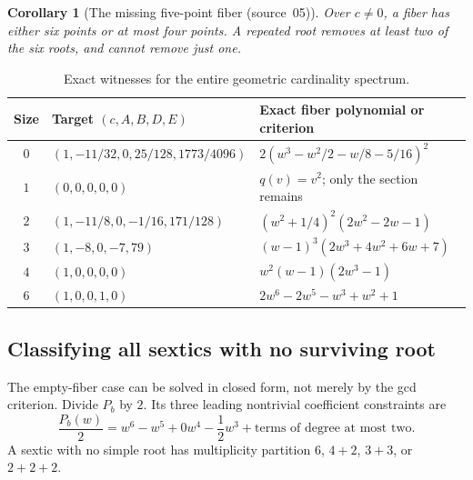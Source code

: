 \documentclass[11pt,a4paper]{article}
\newtheorem{corollary}[theorem]{Corollary}
\theoremstyle{definition}
\newcommand{\src}[1]{\textup{(source~#1)}}
\begin{document}
\begin{corollary}[The missing five-point fiber \src{05}]\label{f6:kf:cor:no5}
Over $c\ne0$, a fiber has either six points or at most four points. A
repeated root removes at least two of the six roots, and cannot remove just
one.
\end{corollary}

\begin{table}[htbp]
\centering\small
\renewcommand{\arraystretch}{1.4}
\begin{tabularx}{\textwidth}{@{}c>{\raggedright\arraybackslash}p{}X@{}}
\toprule
Size & Target $(c,A,B,D,E)$ & Exact fiber polynomial or criterion\\
\midrule
$0$ & $(1,-11/32,0,25/128,1773/4096)$ &
$2(w^3-w^2/2-w/8-5/16)^2$\\
$1$ & $(0,0,0,0,0)$ & $q(v)=v^2$; only the section remains\\
$2$ & $(1,-11/8,0,-1/16,171/128)$ &
$(w^2+1/4)^2(2w^2-2w-1)$\\
$3$ & $(1,-8,0,-7,79)$ &
$(w-1)^3(2w^3+4w^2+6w+7)$\\
$4$ & $(1,0,0,0,0)$ & $w^2(w-1)(2w^3-1)$\\
$6$ & $(1,0,0,1,0)$ & $2w^6-2w^5-w^3+w^2+1$\\
\bottomrule
\end{tabularx}
\caption{Exact witnesses for the entire geometric cardinality spectrum.}
\label{f6:tab:witness}
\end{table}

\subsection{Classifying all sextics with no surviving root}
The empty-fiber case can be solved in closed form, not merely by the gcd
criterion. Divide $P_b$ by $2$. Its three leading nontrivial coefficient
constraints are
\begin{equation}\label{f6:eq:fixedcoeff}
 \frac{P_b(w)}2=w^6-w^5+0w^4-\frac12w^3+\text{terms of degree at most two}.
\end{equation}
A sextic with no simple root has multiplicity partition
$6$, $4+2$, $3+3$, or $2+2+2$.
\end{document}
